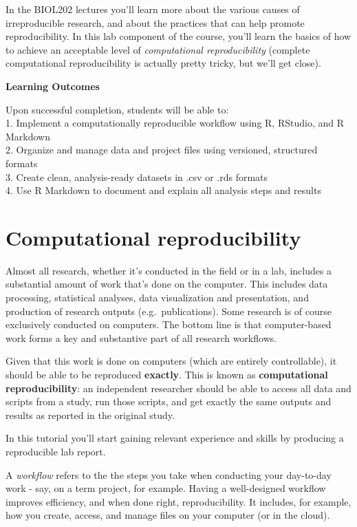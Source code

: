 \documentclass[
]{book}
\begin{document}
In the BIOL202 lectures you'll learn more about the various causes of irreproducible research, and about the practices that can help promote reproducibility. In this lab component of the course, you'll learn the basics of how to achieve an acceptable level of \emph{computational reproducibility} (complete computational reproducibility is actually pretty tricky, but we'll get close).

\textbf{Learning Outcomes}

Upon successful completion, students will be able to:\\
1. Implement a computationally reproducible workflow using R, RStudio, and R Markdown\\
2. Organize and manage data and project files using versioned, structured formats\\
3. Create clean, analysis-ready datasets in .csv or .rds formats\\
4. Use R Markdown to document and explain all analysis steps and results

\section{Computational reproducibility}\label{comp_repro}

Almost all research, whether it's conducted in the field or in a lab, includes a substantial amount of work that's done on the computer. This includes data processing, statistical analyses, data visualization and presentation, and production of research outputs (e.g.~publications). Some research is of course exclusively conducted on computers. The bottom line is that computer-based work forms a key and substantive part of all research workflows.

Given that this work is done on computers (which are entirely controllable), it should be able to be reproduced \textbf{exactly}. This is known as \textbf{computational reproducibility}: an independent researcher should be able to access all data and scripts from a study, run those scripts, and get exactly the same outputs and results as reported in the original study.

In this tutorial you'll start gaining relevant experience and skills by producing a reproducible lab report.

A \emph{workflow} refers to the the steps you take when conducting your day-to-day work - say, on a term project, for example. Having a well-designed workflow improves efficiency, and when done right, reproducibility. It includes, for example, how you create, access, and manage files on your computer (or in the cloud).
\end{document}
